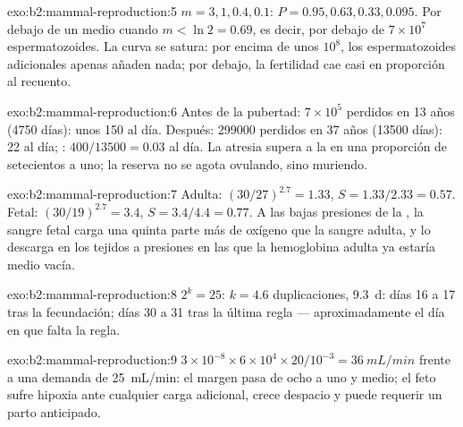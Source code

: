 \begin{solution}{exo:b2:mammal-reproduction:5}
$m = 3, 1, 0.4, 0.1$: $P = 0.95, 0.63, 0.33, 0.095$. Por debajo de un
medio cuando $m < \ln 2 = 0.69$, es decir, por debajo de $7\times 10^{7}$
espermatozoides. La curva se satura: por encima de unos $10^{8}$, los
espermatozoides adicionales apenas añaden nada; por debajo, la fertilidad
cae casi en proporción al recuento.
\end{solution}

\begin{solution}{exo:b2:mammal-reproduction:6}
Antes de la pubertad: $7\times 10^{5}$ perdidos en 13 años (\num{4750}
días): unos 150 al día. Después: \num{299000} perdidos en 37 años
(\num{13500} días): 22 al día; : $400/\num{13500} = 0.03$ al día.
La atresia supera a la  en una proporción de setecientos a uno;
la reserva no se agota ovulando, sino muriendo.
\end{solution}

\begin{solution}{exo:b2:mammal-reproduction:7}
Adulta: $(30/27)^{2.7} = 1.33$, $S = 1.33/2.33 = 0.57$. Fetal:
$(30/19)^{2.7} = 3.4$, $S = 3.4/4.4 = 0.77$. A las bajas presiones de la
, la sangre fetal carga una quinta parte más de oxígeno que la
sangre adulta, y lo descarga en los tejidos a presiones en las que la
hemoglobina adulta ya estaría medio vacía.
\end{solution}

\begin{solution}{exo:b2:mammal-reproduction:8}
$2^{k} = 25$: $k = 4.6$ duplicaciones, \qty{9.3}{d}: días 16 a 17 tras la
fecundación; días 30 a 31 tras la última regla --- aproximadamente el día
en que falta la regla.
\end{solution}

\begin{solution}{exo:b2:mammal-reproduction:9}
$3\times 10^{-8}\times 6\times 10^{4}\times 20/10^{-3} =
\qty{36}{mL/min}$ frente a una demanda de \qty{25}{mL/min}: el margen pasa
de ocho a uno y medio; el feto sufre hipoxia ante cualquier carga
adicional, crece despacio y puede requerir un parto anticipado.
\end{solution}

